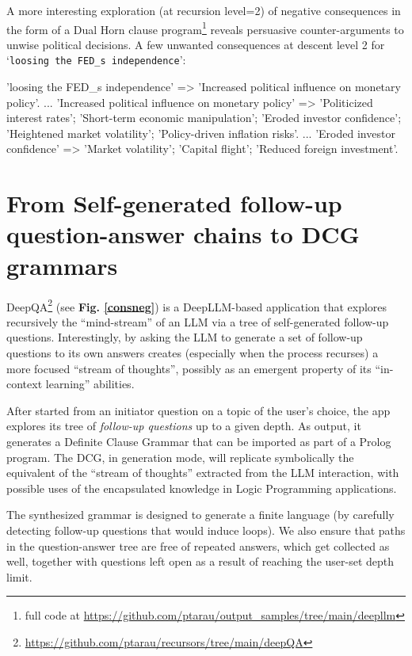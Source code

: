 \documentclass[submission,copyright,creativecommons]{eptcs}
\begin{document}
A more interesting exploration (at recursion level=2) of negative consequences in the form of a Dual Horn clause program\footnote{full code at \url{https://github.com/ptarau/output_samples/tree/main/deepllm}}
reveals persuasive counter-arguments to unwise political decisions.
\BX
A few unwanted consequences at descent level 2 for `{\tt loosing the FED\_s independence}':
\begin{code}
'loosing the FED_s independence' => 
    'Increased political influence on monetary policy'. %
...
'Increased political influence on monetary policy' =>
    'Politicized interest rates';
    'Short-term economic manipulation';
    'Eroded investor confidence'; %
    'Heightened market volatility';
    'Policy-driven inflation risks'.
 ...
 'Eroded investor confidence' => %
    'Market volatility';
    'Capital flight';
    'Reduced foreign investment'.
\end{code}
\EX

\section{From Self-generated follow-up question-answer chains to DCG grammars}\label{grams}

DeepQA\footnote{\url{https://github.com/ptarau/recursors/tree/main/deepQA}} 
(see {\bf Fig. \ref{consneg}}) is a DeepLLM-based application that explores recursively the ``mind-stream'' of an LLM via a tree of self-generated follow-up questions.
Interestingly, by asking the LLM to generate a set of follow-up questions to its own answers creates (especially when the process recurses) a more focused ``stream of thoughts'', possibly as an emergent property of its ``in-context learning'' abilities.


After started from an initiator question on a topic of the user's choice, the app explores its tree of {\em follow-up questions} up to a given depth. As output, it generates a Definite Clause Grammar that can be imported as part of a Prolog program. The DCG, in generation mode, will replicate symbolically the equivalent of the ``stream of thoughts'' extracted from the LLM interaction, with possible uses of the encapsulated knowledge in Logic Programming applications.

The synthesized grammar is designed to generate a finite language (by carefully detecting follow-up questions that would induce loops). We also ensure that paths in the question-answer tree are free of repeated answers, which get collected as well, together with questions left open as a result of reaching the user-set depth limit.
\end{document}
